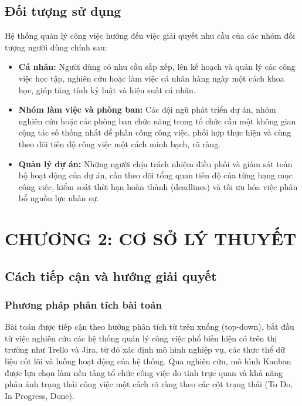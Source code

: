 \subsection{Đối tượng sử dụng}
Hệ thống quản lý công việc hướng đến việc giải quyết nhu cầu của các nhóm đối tượng người dùng chính sau:
\begin{itemize}
    \item \textbf{Cá nhân:} Người dùng có nhu cầu sắp xếp, lên kế hoạch và quản lý các công việc học tập, nghiên cứu hoặc làm việc cá nhân hàng ngày một cách khoa học, giúp tăng tính kỷ luật và hiệu suất cá nhân.
    \item \textbf{Nhóm làm việc và phòng ban:} Các đội ngũ phát triển dự án, nhóm nghiên cứu hoặc các phòng ban chức năng trong tổ chức cần một không gian cộng tác số thống nhất để phân công công việc, phối hợp thực hiện và cùng theo dõi tiến độ công việc một cách minh bạch, rõ ràng.
    \item \textbf{Quản lý dự án:} Những người chịu trách nhiệm điều phối và giám sát toàn bộ hoạt động của dự án, cần theo dõi tổng quan tiến độ của từng hạng mục công việc, kiểm soát thời hạn hoàn thành (deadlines) và tối ưu hóa việc phân bổ nguồn lực nhân sự.
\end{itemize}
\clearpage

\setcounter{secnumdepth}{4}
\setcounter{tocdepth}{4}
\section{CHƯƠNG 2: CƠ SỞ LÝ THUYẾT}

\subsection{Cách tiếp cận và hướng giải quyết}

\subsubsection{Phương pháp phân tích bài toán}
Bài toán được tiếp cận theo hướng phân tích từ trên xuống (top-down), bắt đầu từ việc nghiên cứu các hệ thống quản lý công việc phổ biến hiện có trên thị trường như Trello và Jira, từ đó xác định mô hình nghiệp vụ, các thực thể dữ liệu cốt lõi và luồng hoạt động của hệ thống. Qua nghiên cứu, mô hình Kanban được lựa chọn làm nền tảng tổ chức công việc do tính trực quan và khả năng phản ánh trạng thái công việc một cách rõ ràng theo các cột trạng thái (To Do, In Progress, Done).

